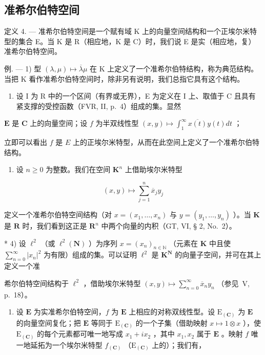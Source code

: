 \subsection{准希尔伯特空间}

定义 4. --- 准希尔伯特空间是一个赋有域 K 上的向量空间结构和一个正埃尔米特型的集合 E。当 K 是 R（相应地，K 是 C）时，我们说 E 是实（相应地，复）准希尔伯特空间。

例. --- 1) 型 \((\lambda, \mu) \mapsto \overline{\lambda}\mu\) 在 K 上定义了一个准希尔伯特结构，称为典范结构。当把 K 看作准希尔伯特空间时，除非另有说明，我们总指它具有这个结构。

\begin{enumerate}
\def\labelenumi{\arabic{enumi})}
\setcounter{enumi}{1}
\tightlist
\item
  设 I 为 R 中的一个区间（有界或无界），E 为定义在 I 上、取值于 C 且具有紧支撑的受控函数（FVR, II, p.~4）组成的集。显然
\end{enumerate}

\(\mathbf{E}\) 是 \(\mathbf{C}\) 上的向量空间；设 \(f\) 为半双线性型 \((x, y) \mapsto \int_{1}^{\infty} \overline{x(t)} y(t) dt\) ；

立即可以看出 \(f\) 是 \(E\) 上的正埃尔米特型，从而在此空间上定义了一个准希尔伯特结构。

\begin{enumerate}
\def\labelenumi{\arabic{enumi})}
\setcounter{enumi}{2}
\tightlist
\item
  设 \(n \geqslant 0\) 为整数。我们在空间 \(\mathbf{K}^n\) 上借助埃尔米特型
\end{enumerate}

\[
(x, y) \mapsto \sum_ {j = 1} ^ {n} \overline {{{{x}}}} _ {j} y _ {j}
\]

定义一个准希尔伯特空间结构（对 \(x = (x_{1}, \ldots, x_{n})\) 与 \(y = (y_{1}, \ldots, y_{n})\) ）。当 \(\mathbf{K}\) 是 \(\mathbf{R}\) 时，我们看到这正是 \(\mathbf{R}^{n}\) 中两个向量的内积（GT, VI, § 2, No.~2）。

* 4) 设 \(\ell^2\) （或 \(\ell^2(\mathbf{N})\) ）为序列 \(x = (x_n)_{n \in \mathbb{N}}\) （元素在 \(\mathbf{K}\) 中且使 \(\sum_{n=0}^{\infty} |x_n|^2\) 为有限）组成的集。可以证明 \(\ell^2\) 是 \(\mathbf{K}^{\mathbf{N}}\) 的向量子空间，并可在其上定义一个准

希尔伯特空间结构于 \(\ell^2\) ，借助埃尔米特型 \((x, y) \mapsto \sum_{n=0}^{\infty} \overline{x}_n y_n\) （参见~V, p.~18）。

\begin{enumerate}
\def\labelenumi{\arabic{enumi})}
\setcounter{enumi}{4}
\tightlist
\item
  设 \(\mathbf{E}\) 为实准希尔伯特空间，\(f\) 为 \(\mathbf{E}\) 上相应的对称双线性型。设 \(\mathrm{E}_{(\mathbf{C})}\) 为 \(\mathbf{E}\) 的向量空间复化；把 \(\mathbf{E}\) 等同于 \(\mathrm{E}_{(\mathbf{C})}\) 的一个子集（借助映射 \(x \mapsto 1 \otimes x\) ），使 \(\mathrm{E}_{(\mathbf{C})}\) 的每个元素都可唯一地写成 \(x_1 + ix_2\) ，其中 \(x_1, x_2\) 属于 \(\mathbf{E}\) 。映射 \(f\) 唯一地延拓为一个埃尔米特型 \(f_{(\mathbf{C})}\) （\(\mathrm{E}_{(\mathbf{C})}\) 上的）；我们有，
\end{enumerate}

